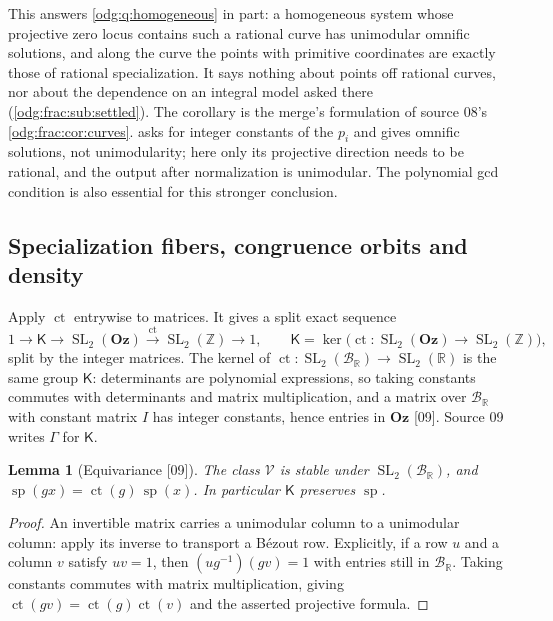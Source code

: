 \documentclass[11pt,oneside]{article}
\numberwithin{equation}{section}
\newtheorem{lemma}[lemma]{Lemma}
\theoremstyle{definition}
\theoremstyle{remark}
\newcommand{\Oz}{\mathbf{Oz}}
\newcommand{\Z}{\mathbb Z}
\newcommand{\R}{\mathbb R}
\newcommand{\BR}{\mathcal B_{\R}}
\newcommand{\ct}{\operatorname{ct}}
\newcommand{\SL}{\operatorname{SL}}
\newcommand{\src}[1]{\textup{\textsf{\small[#1]}}}
\newcommand{\spz}{\operatorname{sp}}
\newcommand{\Vreg}{\mathcal V}
\newcommand{\Kcong}{\mathsf K}
\begin{document}
This answers \cref{odg:q:homogeneous} in part: a homogeneous system whose
projective zero locus contains such a rational curve has unimodular omnific
solutions, and along the curve the points with primitive coordinates are
exactly those of rational specialization. It says nothing about points off
rational curves, nor about the dependence on an integral model asked there
(\cref{odg:frac:sub:settled}). The corollary is the merge's formulation of
source 08's \cref{odg:frac:cor:curves}.  asks for
integer constants of the $p_i$ and gives omnific solutions, not unimodularity;
here only its projective direction needs to be rational, and the output
after normalization is unimodular. The polynomial gcd condition is also
essential for this stronger conclusion.

\subsection{Specialization fibers, congruence orbits and density}\label{odg:frac:sub:orbits}

Apply $\ct$ entrywise to matrices. It gives a split exact sequence
\[
 1\longrightarrow\Kcong\longrightarrow\SL_2(\Oz)\xrightarrow{\ \ct\ }\SL_2(\Z)\longrightarrow1,
 \qquad \Kcong=\ker\bigl(\ct:\SL_2(\Oz)\to\SL_2(\Z)\bigr),
\]
split by the integer matrices. The kernel of $\ct:\SL_2(\BR)\to\SL_2(\R)$ is the
same group $\Kcong$: determinants are polynomial expressions, so taking
constants commutes with determinants and matrix multiplication, and a matrix
over $\BR$ with constant matrix $I$ has integer
constants, hence entries in $\Oz$ \src{09}. Source 09 writes $\Gamma$ for
$\Kcong$.

\begin{lemma}[Equivariance \src{09}]\label{odg:frac:lem:equivariance}
The class $\Vreg$ is stable under $\SL_2(\BR)$, and
$\spz(gx)=\ct(g)\,\spz(x)$. In particular $\Kcong$ preserves $\spz$.
\end{lemma}
\begin{proof}
An invertible matrix carries a unimodular column to a unimodular column: apply
its inverse to transport a B\'ezout row. Explicitly, if a row $u$ and a
column $v$ satisfy $uv=1$, then $(ug^{-1})(gv)=1$ with entries still in
$\BR$. Taking constants commutes with matrix multiplication, giving
$\ct(gv)=\ct(g)\ct(v)$ and the asserted projective formula.
\end{proof}
\end{document}
